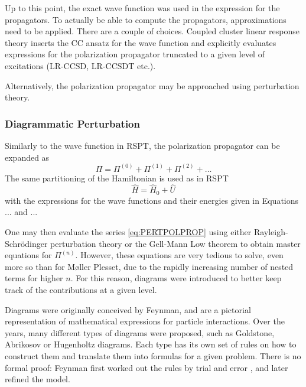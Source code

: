Up to this point, the exact wave function was used in the expression for the propagators. To actually be able to compute the propagators, approximations need to be applied. There are a couple of choices. Coupled cluster linear response theory inserts the CC ansatz for the wave function and explicitly evaluates expressions for the polarization propagator truncated to a given level of excitations (LR-CCSD, LR-CCSDT etc.).

Alternatively, the polarization propagator may be approached using perturbation theory.

\subsubsection{Diagrammatic Perturbation}

Similarly to the wave function in RSPT, the polarization propagator can be expanded as
\begin{equation}
\Pi = \Pi^{(0)} + \Pi^({1}) + \Pi^{(2)} + \ldots
\label{eq:PERTPOLPROP}
\end{equation}
\noindent The same partitioning of the Hamiltonian is used as in RSPT
\begin{equation}
\hat{H} = \hat{H}_0 + \hat{U}
\end{equation}
\noindent with the expressions for the wave functions and their energies given in Equations ... and ... 

One may then evaluate the series \ref{eq:PERTPOLPROP} using either Rayleigh-Schrödinger perturbation theory or the Gell-Mann Low theorem \cite{Sch2018} to obtain master equations for $\Pi^{(n)}$. However, these equations are very tedious to solve, even more so than for M{\o}ller Plesset, due to the rapidly increasing number of nested terms for higher $n$. For this reason, diagrams were introduced to better keep track of the contributions at a given level. 

Diagrams were originally conceived by Feynman, and are a pictorial representation of mathematical expressions for particle interactions. Over the years, many different types of diagrams were proposed, such as Goldstone, Abrikosov or Hugenholtz diagrams. Each type has its own set of rules on how to construct them and translate them into formulas for a given problem. There is no formal proof: Feynman first worked out the rules by trial and error \cite{Fey1966}, and later refined the model.


